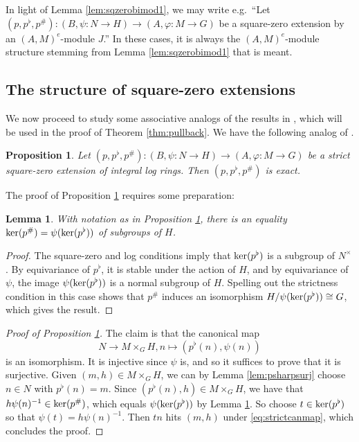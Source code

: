 \documentclass[a4paper,10pt%
]{amsart}
\numberwithin{equation}{section}
\newtheorem{lemma}[subsection]{Lemma}
\newtheorem{proposition}[subsection]{Proposition}
\theoremstyle{definition}
\renewcommand{\:}{\colon}
\begin{document}
In light of Lemma \ref{lem:sqzerobimod1}, we may write e.g.\ ``Let $(p, p^\flat, p^\#) \colon (B, \psi \colon N \to H) \to (A, \varphi \colon M \to G)$ be a square-zero extension by an $(A, M)^e$-module $J$.'' In these cases, it is always the $(A, M)^e$-module structure stemming from Lemma \ref{lem:sqzerobimod1} that is meant. 

\subsection{The structure of square-zero extensions} We now proceed to study some associative analogs of the results in \cite[Section 4]{SSV16}, which will be used in the proof of Theorem \ref{thm:pullback}. We have the following analog of \cite[Lemma 4.15]{SSV16}. 

\begin{proposition}\label{prop:strictsqzeroexact} Let $(p, p^\flat, p^\#) \colon (B, \psi \colon N \to H) \to (A, \varphi \colon M \to G)$ be a strict square-zero extension of integral log rings. Then $(p, p^\flat, p^\#)$ is exact. 
\end{proposition}

\noindent The proof of Proposition \ref{prop:strictsqzeroexact} requires some preparation:

\begin{lemma}\label{lem:strictsquarezeroexact2} With notation as in Proposition \ref{prop:strictsqzeroexact}, there is an equality ${\rm ker}(p^\#) = \psi({\rm ker}(p^\flat))$ of subgroups of $H$.  
\end{lemma}

\begin{proof} The square-zero and log conditions imply that ${\rm ker}(p^\flat)$ is a subgroup of $N^\times$. By equivariance of $p^\flat$, it is stable under the action of $H$, and by equivariance of $\psi$, the image $\psi({\rm ker}(p^\flat))$ is a normal subgroup of $H$. Spelling out the strictness condition in this case shows that $p^\#$ induces an isomorphism $H / \psi({\rm ker}(p^\flat)) \cong G$, which gives the result. 
\end{proof}

\begin{proof}[Proof of Proposition \ref{prop:strictsqzeroexact}] The claim is that the canonical map \begin{equation}\label{eq:strictcanmap}N \to M \times_G H, n \mapsto (p^\flat(n), \psi(n))\end{equation} is an isomorphism. It is injective since $\psi$ is, and so it suffices to prove that it is surjective. Given $(m, h) \in M \times_G H$, we can by Lemma \ref{lem:psharpsurj} choose $n \in N$ with $p^\flat(n) = m$. Since $(p^\flat(n), h) \in M \times_G H$, we have that $h\psi(n)^{-1} \in {\rm ker}(p^\#)$, which equals $\psi({\rm ker}(p^\flat))$ by Lemma \ref{lem:strictsquarezeroexact2}. So choose $t \in {\rm ker}(p^\flat)$ so that $\psi(t) = h\psi(n)^{-1}$. Then $tn$ hits $(m, h)$ under \eqref{eq:strictcanmap}, which concludes the proof. 
\end{proof}
\end{document}
